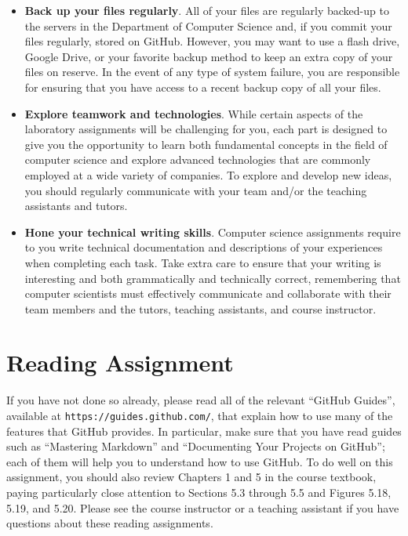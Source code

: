 \documentclass[11pt]{article}
\newcommand{\url}[1]{\lstinline{#1}}
\begin{document}
\begin{itemize}
\item {\bf Back up your files regularly}. All of your files are regularly backed-up to the servers in the Department of
  Computer Science and, if you commit your files regularly, stored on GitHub. However, you may want to use a flash
  drive, Google Drive, or your favorite backup method to keep an extra copy of your files on reserve. In the event of
  any type of system failure, you are responsible for ensuring that you have access to a recent backup copy of all your
  files.

\item {\bf Explore teamwork and technologies}. While certain aspects of the laboratory assignments will be challenging
  for you, each part is designed to give you the opportunity to learn both fundamental concepts in the field of computer
  science and explore advanced technologies that are commonly employed at a wide variety of companies. To explore and
  develop new ideas, you should regularly communicate with your team and/or the teaching assistants and tutors.

\item {\bf Hone your technical writing skills}. Computer science assignments require to you write technical
  documentation and descriptions of your experiences when completing each task. Take extra care to ensure that your
  writing is interesting and both grammatically and technically correct, remembering that computer scientists must
  effectively communicate and collaborate with their team members and the tutors, teaching assistants, and course
  instructor.


\end{itemize}

\section*{Reading Assignment}

If you have not done so already, please read all of the relevant ``GitHub
Guides'', available at \url{https://guides.github.com/}, that explain how to use
many of the features that GitHub provides. In particular, make sure that you
have read guides such as ``Mastering Markdown'' and ``Documenting Your Projects
on GitHub''; each of them will help you to understand how to use GitHub. To do
well on this assignment, you should also review Chapters 1 and 5 in the course
textbook, paying particularly close attention to Sections 5.3 through 5.5 and
Figures 5.18, 5.19, and 5.20. Please see the course instructor or a teaching
assistant if you have questions about these reading assignments.
\end{document}
